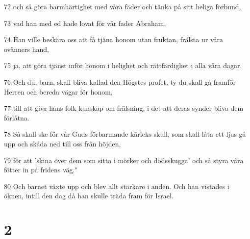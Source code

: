 \par 72 och så göra barmhärtighet med våra fäder och tänka på sitt heliga förbund,
\par 73 vad han med ed hade lovat för vår fader Abraham,
\par 74 Han ville beskära oss att få tjäna honom utan fruktan, frälsta ur våra ovänners hand,
\par 75 ja, att göra tjänst inför honom i helighet och rättfärdighet i alla våra dagar.
\par 76 Och du, barn, skall bliva kallad den Högstes profet, ty du skall gå framför Herren och bereda vägar för honom,
\par 77 till att giva hans folk kunskap om frälsning, i det att deras synder bliva dem förlåtna.
\par 78 Så skall ske för vår Guds förbarmande kärleks skull, som skall låta ett ljus gå upp och skåda ned till oss från höjden,
\par 79 för att 'skina över dem som sitta i mörker och dödsskugga' och så styra våra fötter in på fridens väg."
\par 80 Och barnet växte upp och blev allt starkare i anden. Och han vistades i öknen, intill den dag då han skulle träda fram för Israel.

\chapter{2}

